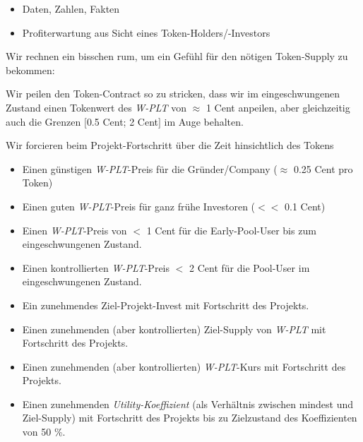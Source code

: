 
\begin{itemize}
	\item Daten, Zahlen, Fakten
	\item Profiterwartung aus Sicht eines Token-Holders/-Investors
\end{itemize}

\vspace{0.5cm}

Wir rechnen ein bisschen rum, um ein Gefühl für den nötigen Token-Supply zu bekommen:

\vspace{0.3cm}

\begin{Example}

\vspace{0.75cm}


\vspace{0.75cm}

Wir peilen den Token-Contract so zu stricken, dass wir im eingeschwungenen Zustand einen Tokenwert des \textit{W-PLT} von $\approx$ 1 Cent anpeilen, aber gleichzeitig auch die Grenzen $[$0.5 Cent; 2 Cent$]$ im Auge behalten.

\vspace{0.5cm}

Wir forcieren beim Projekt-Fortschritt über die Zeit hinsichtlich des Tokens

\begin{itemize}
	\item Einen günstigen \textit{W-PLT}-Preis für die Gründer/Company ($\approx$ 0.25 Cent pro Token)
	\item Einen guten \textit{W-PLT}-Preis für ganz frühe Investoren ($<<$ 0.1 Cent)
	\item Einen \textit{W-PLT}-Preis von $<$ 1 Cent für die Early-Pool-User bis zum eingeschwungenen Zustand.
	\item Einen kontrollierten \textit{W-PLT}-Preis $<$ 2 Cent für die Pool-User im eingeschwungenen Zustand.
	\item Ein zunehmendes Ziel-Projekt-Invest mit Fortschritt des Projekts.
	\item Einen zunehmenden (aber kontrollierten) Ziel-Supply von \textit{W-PLT} mit Fortschritt des Projekts.
	\item Einen zunehmenden (aber kontrollierten) \textit{W-PLT}-Kurs mit Fortschritt des Projekts.
	\item Einen zunehmenden \textit{Utility-Koeffizient} (als Verhältnis zwischen mindest und Ziel-Supply) mit Fortschritt des Projekts bis zu Zielzustand des Koeffizienten von 50 \%.
\end{itemize}


\end{Example}
